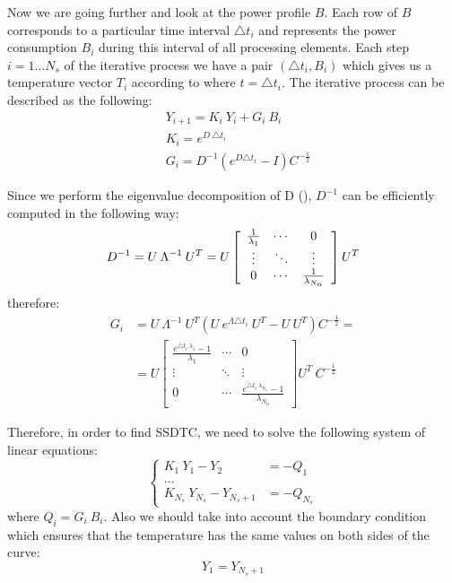 Now we are going further and look at the power profile $B$. Each row of $B$ corresponds to a particular time interval $\triangle t_i$ and represents the power consumption $B_i$ during this interval of all processing elements. Each step $i = 1 \dots N_s$ of the iterative process we have a pair $(\triangle t_i, B_i)$ which gives us a temperature vector $T_i$ according to  where $t = \triangle t_i$. The iterative process can be described as the following:
\begin{align}
  & Y_{i+1} = K_i \: Y_i + G_i \: B_i \label{eq:ce-recurrent} \\
  & K_i = e^{D \: \triangle t_i} \nonumber \\
  & G_i = D^{-1} \left( e^{D \triangle t_i} - I \right) C^{-\frac{1}{2}} \nonumber
\end{align}

Since we perform the eigenvalue decomposition of D (), $D^{-1}$ can be efficiently computed in the following way:
\[
  D^{-1} = U \: \Lambda^{-1} \: U^T = U \left[
      \begin{array}{ccc}
        \frac{1}{\lambda_1} & \cdots & 0 \\
        \vdots & \ddots & \vdots \\
        0 & \cdots & \frac{1}{\lambda_{N_n}}
      \end{array}
    \right] U^T \\
\]
therefore:
\begin{align*}
  G_i & = U \: \Lambda^{-1} \: U^T \left(U \: e^{\Lambda \triangle t_i} \: U^T - U \: U^T \right) C^{-\frac{1}{2}} = \\
      & = U \left[
        \begin{array}{ccc}
          \frac{e^{\triangle t_i \: \lambda_1} - 1}{\lambda_1} & \cdots & 0 \\
          \vdots & \ddots & \vdots \\
          0 & \cdots & \frac{e^{\triangle t_i \: \lambda_{N_n}} - 1}{\lambda_{N_n}}
        \end{array}
      \right] U^T \: C^{-\frac{1}{2}}
\end{align*}

Therefore, in order to find SSDTC, we need to solve the following system of linear equations:
\[
  \begin{cases}
    K_1 \: Y_1 - Y_2 & = -Q_1 \\
    ... \\
    K_{N_s} \: Y_{N_s} - Y_{N_s + 1} & = -Q_{N_s}
  \end{cases}
\]
where $Q_i = G_i \: B_i$. Also we should take into account the boundary condition which ensures that the temperature has the same values on both sides of the curve:
\begin{equation} \label{eq:boundary-condition}
  Y_1 = Y_{N_s + 1}
\end{equation}

